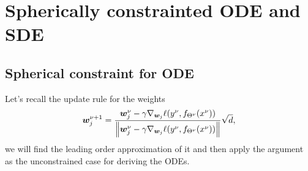 \section{Spherically constrainted ODE and SDE}

\label{2305:app:spherical_constraint}
\subsection{Spherical constraint for ODE}
Let's recall the update rule for the weights
\begin{equation}
    {\boldsymbol{w}}_j^{\nu+1} = \frac{{\boldsymbol{w}}_j^{\nu}-\gamma\nabla_{{\boldsymbol{w}}_j}\ell(y^{\nu},f_{\Theta^{\nu}}(x^{\nu}))}{\left\lVert{\boldsymbol{w}}_j^{\nu}-\gamma\nabla_{{\boldsymbol{w}}_j}\ell(y^{\nu},f_{\Theta^{\nu}}(x^{\nu}))\right\rVert}\sqrt{d},
\end{equation}
we will find the leading order approximation of it and then apply the argument as the unconstrained case for deriving the ODEs.

